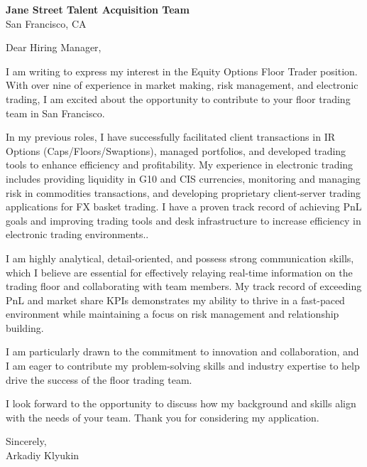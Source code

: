 \documentclass{letter}
\begin{document}
\begin{letter}{\textbf{Jane Street Talent Acquisition Team} \\
                San Francisco, CA}
\opening{Dear Hiring Manager,}

I am writing to express my interest in the Equity Options Floor Trader position. With over nine of experience in market making, risk management, and electronic trading, I am excited about the opportunity to contribute to your floor trading team in San Francisco.

In my previous roles, I have successfully facilitated client transactions in IR Options (Caps/Floors/Swaptions), managed portfolios, and developed trading tools to enhance efficiency and profitability. My experience in electronic trading includes providing liquidity in G10 and CIS currencies, monitoring and managing risk in commodities transactions, and developing proprietary client-server trading applications for FX basket trading. I have a proven track record of achieving PnL goals and improving trading tools and desk infrastructure to increase efficiency in electronic trading environments..

I am highly analytical, detail-oriented, and possess strong communication skills, which I believe are essential for effectively relaying real-time information on the trading floor and collaborating with team members. My track record of exceeding PnL and market share KPIs demonstrates my ability to thrive in a fast-paced environment while maintaining a focus on risk management and relationship building.

I am particularly drawn to the commitment to innovation and collaboration, and I am eager to contribute my problem-solving skills and industry expertise to help drive the success of the floor trading team.

I look forward to the opportunity to discuss how my background and skills align with the needs of your team. Thank you for considering my application.

Sincerely,\\
Arkadiy Klyukin
\end{letter}
\end{document}
